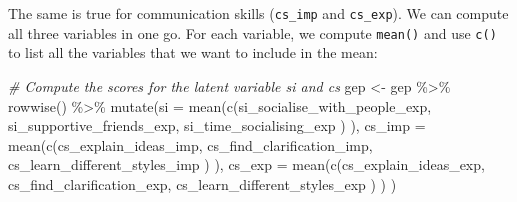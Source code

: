 \documentclass[
]{book}
\newenvironment{Shaded}{\begin{snugshade}}{\end{snugshade}}
\newcommand{\AttributeTok}[1]{\textcolor[rgb]{0.77,0.63,0.00}{#1}}
\newcommand{\CommentTok}[1]{\textcolor[rgb]{0.56,0.35,0.01}{\textit{#1}}}
\newcommand{\FunctionTok}[1]{\textcolor[rgb]{0.00,0.00,0.00}{#1}}
\newcommand{\NormalTok}[1]{#1}
\newcommand{\OtherTok}[1]{\textcolor[rgb]{0.56,0.35,0.01}{#1}}
\newcommand{\SpecialCharTok}[1]{\textcolor[rgb]{0.00,0.00,0.00}{#1}}
\begin{document}
The same is true for communication skills (\texttt{cs\_imp} and \texttt{cs\_exp}). We can compute all three variables in one go. For each variable, we compute \texttt{mean()} and use \texttt{c()} to list all the variables that we want to include in the mean:

\begin{Shaded}
\begin{Highlighting}[]
\CommentTok{\# Compute the scores for the latent variable \textquotesingle{}si\textquotesingle{} and \textquotesingle{}cs\textquotesingle{}}
\NormalTok{gep }\OtherTok{\textless{}{-}}\NormalTok{ gep }\SpecialCharTok{\%\textgreater{}\%} 
  \FunctionTok{rowwise}\NormalTok{() }\SpecialCharTok{\%\textgreater{}\%} 
  \FunctionTok{mutate}\NormalTok{(}\AttributeTok{si =} \FunctionTok{mean}\NormalTok{(}\FunctionTok{c}\NormalTok{(si\_socialise\_with\_people\_exp,}
\NormalTok{                     si\_supportive\_friends\_exp,}
\NormalTok{                     si\_time\_socialising\_exp}
\NormalTok{                     )}
\NormalTok{                   ),}
         \AttributeTok{cs\_imp =} \FunctionTok{mean}\NormalTok{(}\FunctionTok{c}\NormalTok{(cs\_explain\_ideas\_imp,}
\NormalTok{                         cs\_find\_clarification\_imp,}
\NormalTok{                         cs\_learn\_different\_styles\_imp}
\NormalTok{                         )}
\NormalTok{                       ),}
         \AttributeTok{cs\_exp =} \FunctionTok{mean}\NormalTok{(}\FunctionTok{c}\NormalTok{(cs\_explain\_ideas\_exp,}
\NormalTok{                         cs\_find\_clarification\_exp,}
\NormalTok{                         cs\_learn\_different\_styles\_exp}
\NormalTok{                         )}
\NormalTok{                       )}
\NormalTok{         )}


\end{Highlighting}
\end{Shaded}
\end{document}
